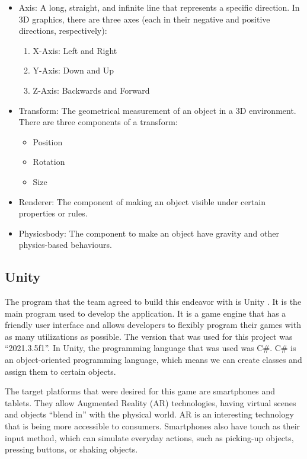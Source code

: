 \begin{itemize}
    \item{Axis: A long, straight, and infinite line that represents a specific direction. In 3D graphics, there are three axes (each in their negative and positive directions, respectively):
\begin{enumerate}
    \item{X-Axis: Left and Right}
    
    \item{Y-Axis: Down and Up}
    
    \item{Z-Axis: Backwards and Forward}

\end{enumerate}}

\item{Transform: The geometrical measurement of an object in a 3D environment. There are three components of a transform:

\begin{itemize}
    \item{Position}
    
    \item{Rotation}
    
    \item{Size}
\end{itemize}
}    

\item{Renderer: The component of making an object visible under certain properties or rules.}

\item{Physicsbody: The component to make an object have gravity and other physics-based behaviours.}
\end{itemize}

\subsection{Unity}
The program that the team agreed to build this endeavor with is Unity \cite{Unity}. It is the main program used to develop the application. It is a game engine that has a friendly user interface and allows developers to flexibly program their games with as many utilizations as possible. The version that was used for this project was “2021.3.5f1”. In Unity, the programming language that was used was C\#. C\# is an object-oriented programming language, which means we can create classes and assign them to certain objects.

The target platforms that were desired for this game are smartphones and tablets. They allow Augmented Reality (AR) technologies, having virtual scenes and objects “blend in” with the physical world. AR is an interesting technology that is being more accessible to consumers. Smartphones also have touch as their input method, which can simulate everyday actions, such as picking-up objects, pressing buttons, or shaking objects.


